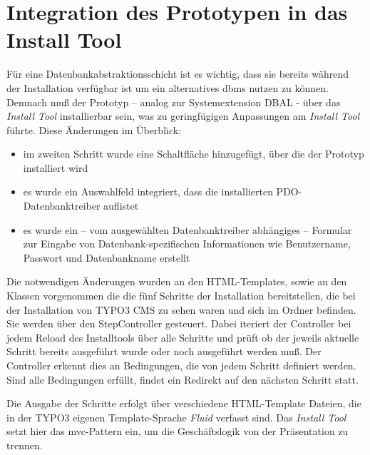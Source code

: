 \section{Integration des Prototypen in das Install Tool}
\label{prototype:sec:integrateIntoInstallTool}
Für eine Datenbankabstraktionsschicht ist es wichtig, dass sie bereits während der Installation verfügbar ist um ein alternatives \gls{dbms} nutzen zu können. Demnach muß der Prototyp – analog zur Systemextension DBAL - über das \textit{Install Tool} installierbar sein, was zu geringfügigen Anpassungen am \textit{Install Tool} führte. Diese Änderungen im Überblick:

\begin{itemize}
\item im zweiten Schritt wurde eine Schaltfläche hinzugefügt, über die der Prototyp installiert wird
\item es wurde ein Auswahlfeld integriert, dass die installierten PDO-Datenbanktreiber auflistet
\item es wurde ein – vom ausgewählten Datenbanktreiber abhängiges – Formular zur Eingabe von Datenbank-spezifischen Informationen wie Benutzername, Passwort und Datenbankname erstellt
\end{itemize}

Die notwendigen Änderungen wurden an den HTML-Templates, sowie an den Klassen vorgenommen die die fünf Schritte der Installation bereitstellen, die bei der Installation von TYPO3 CMS zu sehen waren und sich im Ordner  befinden. Sie werden über den StepController  gesteuert. Dabei iteriert der Controller bei jedem Reload des Installtools über alle Schritte und prüft ob der jeweils aktuelle Schritt bereits ausgeführt wurde oder noch ausgeführt werden muß. Der Controller erkennt dies an Bedingungen, die von jedem Schritt definiert werden.
Sind alle Bedingungen erfüllt, findet ein Redirekt auf den nächsten Schritt statt.

Die Ausgabe der Schritte erfolgt über verschiedene HTML-Template Dateien, die in der TYPO3 eigenen Template-Sprache \textit{Fluid} verfasst sind. Das \textit{Install Tool} setzt hier das \gls{mvc}-Pattern ein, um die Geschäftslogik von der Präsentation zu trennen.


